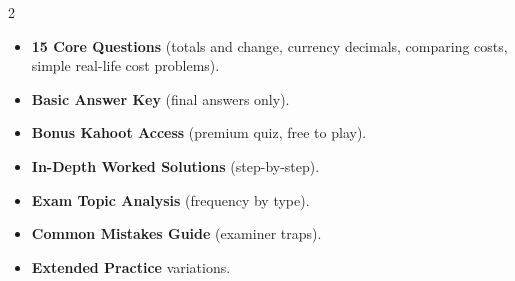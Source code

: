 \documentclass[11pt,a4paper]{article}
\newcommand{\FullReleaseDate}{April 30, 2026}
\begin{document}
\vspace{8pt}

\begin{multicols}{2}
  \begin{tcolorbox}[card, title=\sffamily\bfseries\textcolor{white}{\faHandPointDown\ TODAY (Simplified Version)}, colbacktitle=mainblue, boxed title style={sharp corners, boxrule=0pt}]
    \begin{itemize}[leftmargin=1.2em, itemsep=2pt]
      \item \small \textbf{15 Core Questions} (totals and change, currency decimals, comparing costs, simple real-life cost problems).
      \item \small \textbf{Basic Answer Key} (final answers only).
      \item \small \textbf{Bonus Kahoot Access} (premium quiz, free to play).
    \end{itemize}
  \end{tcolorbox}

  \columnbreak

  \begin{tcolorbox}[card, title=\sffamily\bfseries\textcolor{white}{\faRocket\ ON \FullReleaseDate\ (Full Upgrade)}, colbacktitle=mainblue, boxed title style={sharp corners, boxrule=0pt}]
    \begin{itemize}[leftmargin=1.2em, itemsep=2pt]
      \item \small \textbf{In-Depth Worked Solutions} (step-by-step).
      \item \small \textbf{Exam Topic Analysis} (frequency by type).
      \item \small \textbf{Common Mistakes Guide} (examiner traps).
      \item \small \textbf{Extended Practice} variations.
    \end{itemize}
  \end{tcolorbox}
\end{multicols}
\end{document}
